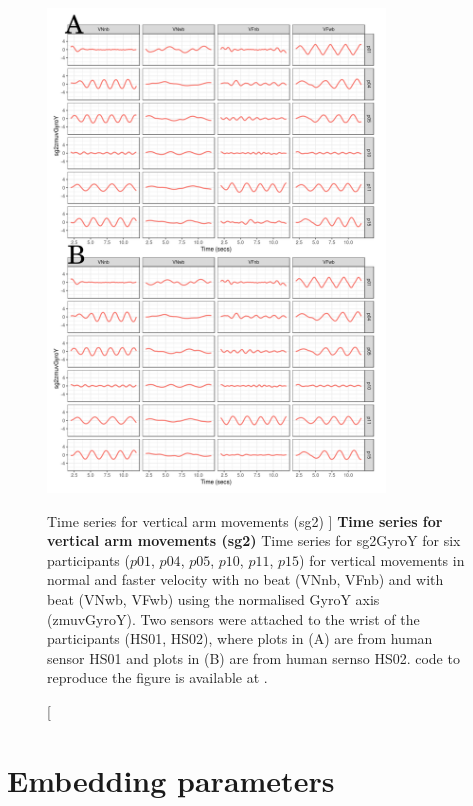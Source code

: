 \begin{figure}
\centering
\includegraphics[width=0.8\textwidth]{ts_V_sg2}
	\caption
	[Time series for vertical arm movements (sg2) ]{
	{\bf Time series for vertical arm movements (sg2)}
		Time series for sg2GyroY for six participants 
		($p01$, $p04$, $p05$, $p10$, $p11$, $p15$) 
		for vertical movements in normal and faster velocity with
		no beat	(VNnb, VFnb) and with beat (VNwb, VFwb) using 
		the normalised GyroY axis (zmuvGyroY).
		Two sensors were attached to the wrist of the participants (HS01, HS02),
		where plots in (A) are from human sensor HS01 and
		plots in (B) are from human sernso HS02.
	\R code to reproduce the figure is available at 
	.
	}
    \label{fig:tssg2gyroY-hii}
\end{figure}




\newpage
\section{Embedding parameters} \label{appendix:e:ep}

